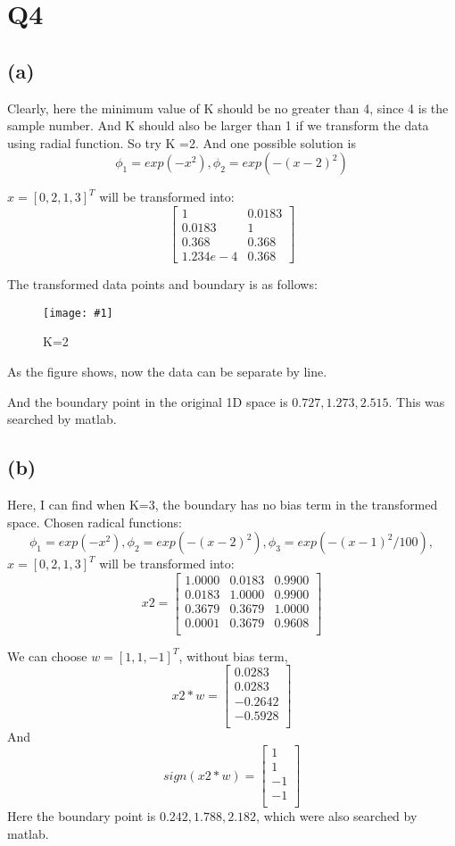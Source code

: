 \documentclass{article}
\newcommand{\myfigureTwo}[4]{
	\begin{figure}[H]
		\centering
		\texttt{[image: \#1]}
		\caption{#2}
		\label{#3}
	\end{figure}
}
\begin{document}
	\newpage
  \section*{Q4}
	\subsection*{(a)}
		Clearly, here the minimum value of K should be no greater than 4, since 4 is the sample number. 
		And K should also be larger than 1 if we transform the data using radial function. 
		So try K =2. 
		And one possible solution is 
		\[
			\phi_1 = exp(-x^2),
			\phi_2 = exp(-(x-2)^2)
		\]
		
		$x = [0,2,1,3]^T $ will be transformed into: 
		$$
		\begin{bmatrix} 
		1	& 0.0183 \\
		0.0183	& 1 \\
		0.368	& 0.368\\
		1.234e-4	& 0.368
		\end{bmatrix}
		$$
	
		The transformed data points and boundary is as follows:
		\myfigureTwo{Q4.jpg}{K=2}{arg3}{1}	
		As the figure shows, now the data can be separate by line. 
		
		And the boundary point in the original 1D space is  
		$ 0.727 ,1.273, 2.515$. This was searched by matlab. 
		
	\subsection*{(b)}
	Here, I can find when K=3, the boundary has no bias term in the transformed space. 
	Chosen radical functions: 
	\[
	\phi_1 = exp(-x^2),
	\phi_2 = exp(-(x-2)^2), 
	\phi_3 = exp(-(x-1)^2/100), 
	\]
		$x = [0,2,1,3]^T $ will be transformed into: 
		$$x2 = 
		\begin{bmatrix} 
    1.0000   & 0.0183  &  0.9900\\
	0.0183   & 1.0000  &  0.9900\\
	0.3679   & 0.3679  &  1.0000\\
	0.0001   & 0.3679  &  0.9608\\
		\end{bmatrix}
		$$	
	
	We can choose $w = [1,1,-1]^T$, without bias term, 
	$$
	x2*w =  
	\begin{bmatrix} 
        0.0283 \\
	    0.0283 \\
	   -0.2642 \\
	   -0.5928 \\
	\end{bmatrix}
	$$ 
	And 
	$$
	sign(x2*w) = 
	\begin{bmatrix} 
       1\\
	   1\\
	  -1\\
	  -1\\
	\end{bmatrix}
	$$
	Here the boundary point is $0.242, 1.788, 2.182$, which were also searched by matlab. 
	
\end{document}
